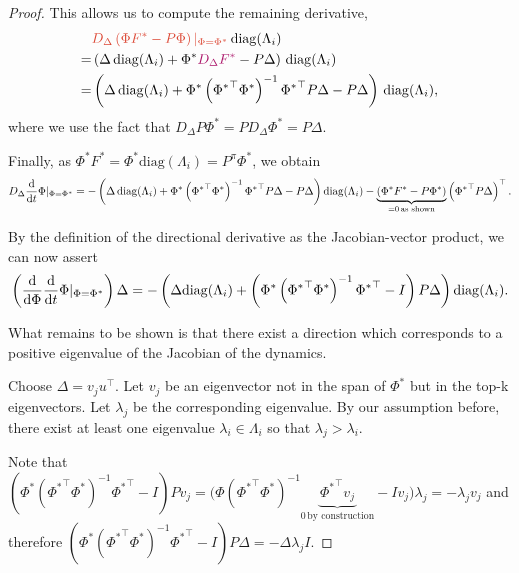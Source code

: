 \begin{proof}
This allows us to compute the remaining derivative,
\begin{align*}
    &{\color{uoftred}D_\Delta \left(\Phi F^* - P \Phi\right)|_{\Phi=\Phi^*}}\, \mathrm{diag}(\Lambda_i)\\
    = & \left(\Delta\, \mathrm{diag}(\Lambda_i) + \Phi^*{\color{uoftmagenta} D_\Delta F^*}  - P\Delta \right)\,\mathrm{diag}(\Lambda_i)\\
    = & \left(\Delta\, \mathrm{diag}(\Lambda_i) + \Phi^*\left({\Phi^*}^\top {\Phi^*}\right)^{-1}{\Phi^*}^\top P \Delta  - P\Delta \right)\,\mathrm{diag}(\Lambda_i),
\end{align*}
where we use the fact that $D_\Delta P\Phi^* = P D_\Delta \Phi^* = P \Delta$.

Finally, as $\Phi^*F^* = \Phi^* \mathrm{diag}(\Lambda_i) = P^\pi \Phi^*$, we obtain
\begin{align*}
 D_\Delta \frac{\mathrm{d}}{\mathrm{d} t} \Phi |_{\Phi=\Phi^*} =   -\left(\Delta\, \mathrm{diag}(\Lambda_i) + {\Phi^*}\left({\Phi^*}^\top \Phi^*\right)^{-1}{\Phi^*}^\top P \Delta  - P\Delta \right)\mathrm{diag}(\Lambda_i) - \underbrace{\left(\Phi^* F^* - P \Phi^*\right)}_{=0\,\text{as shown}}\left({\Phi^*}^\top P \Delta\right)^\top.
\end{align*}


By the definition of the directional derivative as the Jacobian-vector product, we can now assert
\begin{align*}
    \left(\frac{\mathrm{d}}{\mathrm{d} \Phi} \frac{\mathrm{d}}{\mathrm{d} t}\Phi |_{\Phi=\Phi^*}\right) \Delta = - \left(\Delta \mathrm{diag}(\Lambda_i) + \left(\Phi^*\left({\Phi^*}^\top {\Phi^*}\right)^{-1}{\Phi^*}^\top - I\right) P \Delta\right)\mathrm{diag}(\Lambda_i).
\end{align*}

What remains to be shown is that there exist a direction which corresponds to a positive eigenvalue of the Jacobian of the dynamics.

Choose $\Delta = v_j u^\top$. Let $v_j$ be an eigenvector not in the span of $\Phi^*$ but in the top-k eigenvectors. Let  $\lambda_j$ be the corresponding eigenvalue. By our assumption before, there exist at least one eigenvalue $\lambda_i \in \Lambda_i$ so that $\lambda_j > \lambda_i$.

Note that $\left(\Phi^*\left({\Phi^*}^\top {\Phi^*}\right)^{-1}{\Phi^*}^\top - I\right) P v_j = \Big(\Phi\left({\Phi^*}^\top {\Phi^*}\right)^{-1}\underbrace{{\Phi^*}^\top v_j}_{0\, \text{by construction}} - I v_j\Big) \lambda_j = -\lambda_j v_j$ and therefore $\left(\Phi^*\left({\Phi^*}^\top \Phi^*\right)^{-1}{\Phi^*}^\top - I\right) P \Delta = -\Delta \lambda_j I.$


\end{proof}
